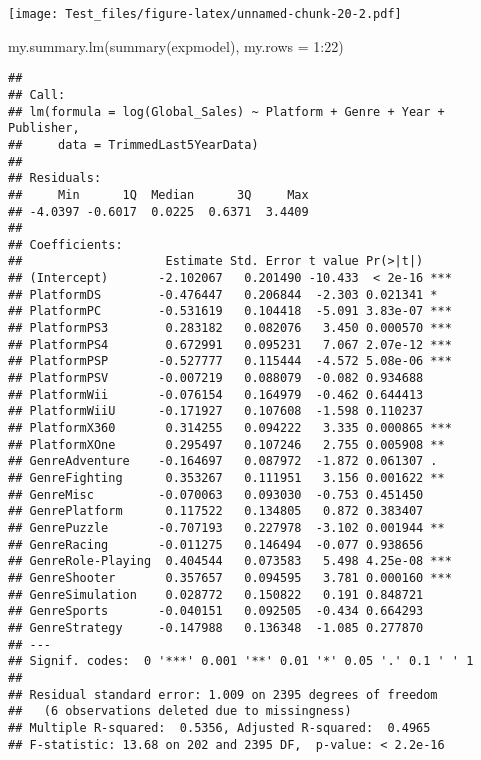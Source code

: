 \documentclass[
]{article}
\newenvironment{Shaded}{\begin{snugshade}}{\end{snugshade}}
\newcommand{\AttributeTok}[1]{\textcolor[rgb]{0.77,0.63,0.00}{#1}}
\newcommand{\DecValTok}[1]{\textcolor[rgb]{0.00,0.00,0.81}{#1}}
\newcommand{\FunctionTok}[1]{\textcolor[rgb]{0.00,0.00,0.00}{#1}}
\newcommand{\NormalTok}[1]{#1}
\newcommand{\SpecialCharTok}[1]{\textcolor[rgb]{0.00,0.00,0.00}{#1}}
\begin{document}
\texttt{[image: Test\_files/figure-latex/unnamed-chunk-20-2.pdf]}

\begin{Shaded}
\begin{Highlighting}[]
\FunctionTok{my.summary.lm}\NormalTok{(}\FunctionTok{summary}\NormalTok{(expmodel), }\AttributeTok{my.rows =} \DecValTok{1}\SpecialCharTok{:}\DecValTok{22}\NormalTok{)}
\end{Highlighting}
\end{Shaded}

\begin{verbatim}
## 
## Call:
## lm(formula = log(Global_Sales) ~ Platform + Genre + Year + Publisher, 
##     data = TrimmedLast5YearData)
## 
## Residuals:
##     Min      1Q  Median      3Q     Max 
## -4.0397 -0.6017  0.0225  0.6371  3.4409 
## 
## Coefficients:
##                    Estimate Std. Error t value Pr(>|t|)    
## (Intercept)       -2.102067   0.201490 -10.433  < 2e-16 ***
## PlatformDS        -0.476447   0.206844  -2.303 0.021341 *  
## PlatformPC        -0.531619   0.104418  -5.091 3.83e-07 ***
## PlatformPS3        0.283182   0.082076   3.450 0.000570 ***
## PlatformPS4        0.672991   0.095231   7.067 2.07e-12 ***
## PlatformPSP       -0.527777   0.115444  -4.572 5.08e-06 ***
## PlatformPSV       -0.007219   0.088079  -0.082 0.934688    
## PlatformWii       -0.076154   0.164979  -0.462 0.644413    
## PlatformWiiU      -0.171927   0.107608  -1.598 0.110237    
## PlatformX360       0.314255   0.094222   3.335 0.000865 ***
## PlatformXOne       0.295497   0.107246   2.755 0.005908 ** 
## GenreAdventure    -0.164697   0.087972  -1.872 0.061307 .  
## GenreFighting      0.353267   0.111951   3.156 0.001622 ** 
## GenreMisc         -0.070063   0.093030  -0.753 0.451450    
## GenrePlatform      0.117522   0.134805   0.872 0.383407    
## GenrePuzzle       -0.707193   0.227978  -3.102 0.001944 ** 
## GenreRacing       -0.011275   0.146494  -0.077 0.938656    
## GenreRole-Playing  0.404544   0.073583   5.498 4.25e-08 ***
## GenreShooter       0.357657   0.094595   3.781 0.000160 ***
## GenreSimulation    0.028772   0.150822   0.191 0.848721    
## GenreSports       -0.040151   0.092505  -0.434 0.664293    
## GenreStrategy     -0.147988   0.136348  -1.085 0.277870    
## ---
## Signif. codes:  0 '***' 0.001 '**' 0.01 '*' 0.05 '.' 0.1 ' ' 1
## 
## Residual standard error: 1.009 on 2395 degrees of freedom
##   (6 observations deleted due to missingness)
## Multiple R-squared:  0.5356, Adjusted R-squared:  0.4965 
## F-statistic: 13.68 on 202 and 2395 DF,  p-value: < 2.2e-16
\end{verbatim}
\end{document}
